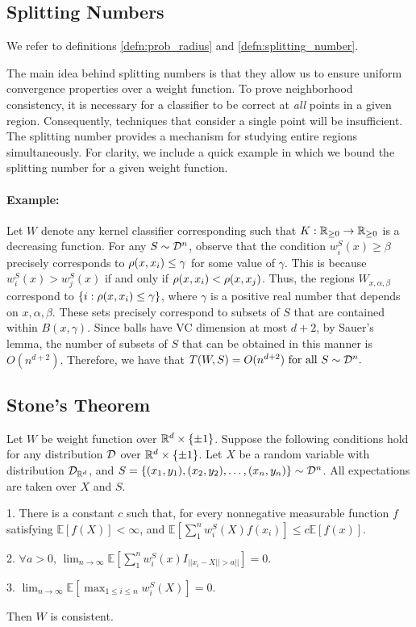 \subsection{Splitting Numbers}

We refer to definitions \ref{defn:prob_radius} and \ref{defn:splitting_number}.



The main idea behind splitting numbers is that they allow us to ensure uniform convergence properties over a weight function. To prove neighborhood consistency, it is necessary for a classifier to be correct at \textit{all} points in a given region. Consequently, techniques that consider a single point will be insufficient. The splitting number provides a mechanism for studying entire regions simultaneously. For clarity, we include a quick example in which we bound the splitting number for a given weight function.

\paragraph{Example:} Let $W$ denote any kernel classifier corresponding such that $K: \mathbb R_{\geq 0} \to \mathbb R_{\geq 0}$ is a decreasing function. For any $S \sim {\mathcal D}^n$, observe that the condition $w_i^S(x) \geq \beta$ precisely corresponds to $\rho(x, x_i) \leq \gamma$ for some value of $\gamma$. This is because $w_i^S(x) > w_j^S(x)$ if and only if $\rho(x, x_i) < \rho(x, x_j)$. Thus, the regions $W_{x, \alpha, \beta}$ correspond to $\{i: \rho(x, x_i) \leq \gamma\}$, where $\gamma$ is a positive real number that depends on $x, \alpha, \beta$. These sets precisely correspond to subsets of $S$ that are contained within $B(x, \gamma)$. Since balls have VC dimension at most $d+2$, by  Sauer's lemma, the number of subsets of $S$ that can be obtained in this manner is $O(n^{d+2})$. Therefore, we have that $T(W,S) = O(n^{d+2})\text{ for all }S \sim {\mathcal D}^n.$

\subsection{Stone's Theorem}

\begin{thm}\label{thm_stone_chapter_1}
\cite{Stone77} Let $W$ be weight function over $\mathbb R^d \times \{\pm 1\}$. Suppose the following conditions hold for any distribution ${\mathcal D}$ over $\mathbb R^d \times \{\pm 1\}$.  Let $X$ be a random variable with distribution ${\mathcal D}_{\mathbb R^d}$, and $S = \{(x_1, y_1), (x_2, y_2), \dots, (x_n, y_n)\} \sim {\mathcal D}^n$. All expectations are taken over $X$ and $S$. 

1. There is a constant $c$ such that, for every nonnegative measurable function $f$ satisfying $\mathbb{E} [f(X)] < \infty$, and $\mathbb{E} [\sum_1^n w_i^S(X)f(x_i)] \leq c \mathbb{E} [f(x)].$

2. $\forall a > 0$, $\lim_{n \to \infty} \mathbb{E}[\sum_1^n w_i^S(x)I_{||x_i - X|| > a||}] = 0.$ 

3. $\lim_{n \to \infty} \mathbb{E}[\max_{1 \leq i \leq n} w_i^S(X)] = 0.$

Then $W$ is consistent. 
\end{thm}

